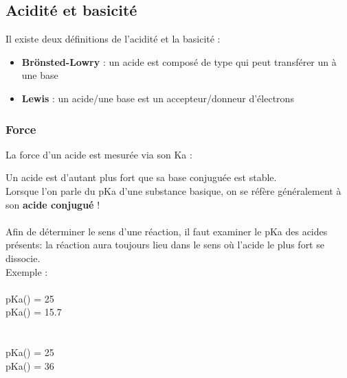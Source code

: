 \documentclass{article}
\newcommand{\insertslide}[2]{
\begin{center}
    \fbox{\texttt{[image: \#1]}}
\end{center}
}
\begin{document}
    \subsection{Acidité et basicité}
        Il existe deux définitions de l'acidité et la basicité :
        \begin{itemize}
            \item \textbf{Brönsted-Lowry} : un acide est composé de type  qui peut transférer un  à une base 
            \item \textbf{Lewis} : un acide/une base est un accepteur/donneur d'électrons
        \end{itemize}
        \subsubsection{Force}
            La force d'un acide est mesurée via son Ka :
            \insertslide{Slides/CM3}{42}
            Un acide est d'autant plus fort que sa base conjuguée est stable.\\
            Lorsque l'on parle du pKa d'une substance basique, on se réfère généralement à son \textbf{acide conjugué} !\\\\
            Afin de déterminer le sens d'une réaction, il faut examiner le pKa des acides présents: la réaction aura toujours lieu dans le sens où l'acide le plus fort se dissocie.\\
            Exemple :\\
            \\
            pKa() = 25\\
            pKa() = 15.7\\\\
            \\
            pKa() = 25\\
            pKa() = 36\\

\pagebreak
\end{document}
